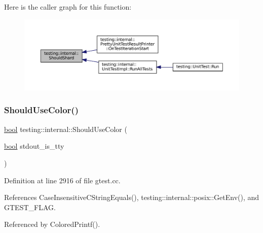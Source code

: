 Here is the caller graph for this function\+:
\nopagebreak
\begin{figure}[H]
\begin{center}
\leavevmode
\includegraphics[width=350pt]{namespacetesting_1_1internal_a0fe41657b1d1ab7ec4e37ec07403ee6c_icgraph}
\end{center}
\end{figure}
\mbox{\label{namespacetesting_1_1internal_ac1db1b4603967a6c4404f31cbbac31a6}} 
\subsubsection{\texorpdfstring{Should\+Use\+Color()}{ShouldUseColor()}}
{\footnotesize\ttfamily \hyperlink{classbool}{bool} testing\+::internal\+::\+Should\+Use\+Color (\begin{DoxyParamCaption}\item[{\hyperlink{classbool}{bool}}]{stdout\+\_\+is\+\_\+tty }\end{DoxyParamCaption})}



Definition at line 2916 of file gtest.\+cc.



References Case\+Insensitive\+C\+String\+Equals(), testing\+::internal\+::posix\+::\+Get\+Env(), and G\+T\+E\+S\+T\+\_\+\+F\+L\+AG.



Referenced by Colored\+Printf().


